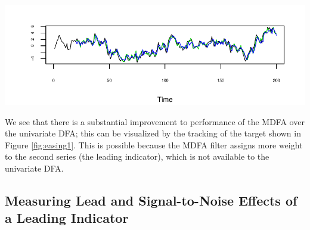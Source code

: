 \documentclass[a4paper]{book}
\begin{document}
\begin{Schunk}
\begin{Soutput}
\begin{figure}[htb!]
\end{Soutput}
\begin{Soutput}
\begin{center}
\end{Soutput}
\begin{Soutput}
\includegraphics[]{mdfa_bimdfa-udfa.pdf}
\end{Soutput}
\begin{Soutput}
\caption{One-step ahead forecasts
 based upon MDFA (green) and univariate DFA (blue), with target in black.
\end{Soutput}
\begin{Soutput}
\label{fig:easing1}}
\end{Soutput}
\begin{Soutput}
\end{center}
\end{Soutput}
\begin{Soutput}
\end{figure}
\end{Soutput}
\end{Schunk}

We see that there is a substantial improvement to performance of the MDFA over
 the univariate DFA; this can be visualized by the tracking of the target
 shown in Figure \ref{fig:easing1}.  This is possible because the MDFA filter
 assigns more weight to the second series (the leading indicator), which is
 not available to the univariate DFA.
 

\subsection{Measuring Lead and Signal-to-Noise Effects of a Leading Indicator}
 \label{lead_snr}
\end{document}
